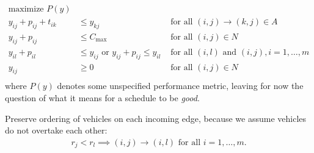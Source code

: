 \documentclass{article}
\begin{document}
\begin{align*}
  \text{maximize } P(y) \\
  y_{ij} + p_{ij} + t_{ik} &\leq y_{kj}  & \text{ for all } (i,j) \xrightarrow{} (k,j) \in A \\
  y_{ij} + p_{ij} &\leq C_{\text{max}} & \text{ for all } (i,j) \in N \\
  y_{il} + p_{il} &\leq  y_{ij} \text{ or } y_{ij} + p_{ij} \leq y_{il}  & \text{ for all } (i,l) \text{ and } (i,j), i =1, \dots,m \\
  y_{ij} &\geq 0 & \text{ for all } (i,j) \in N \\
\end{align*}
where $P(y)$ denotes some unspecified performance metric, leaving for now the
question of what it means for a schedule to be \textit{good}.

Preserve ordering of vehicles on each incoming edge, because we assume vehicles do not overtake each other:
\begin{align*}
  r_{j} < r_{l} \implies (i,j) \rightarrow{} (i,l) \text{ for all } i = 1,\dots,m .
\end{align*}
\end{document}

